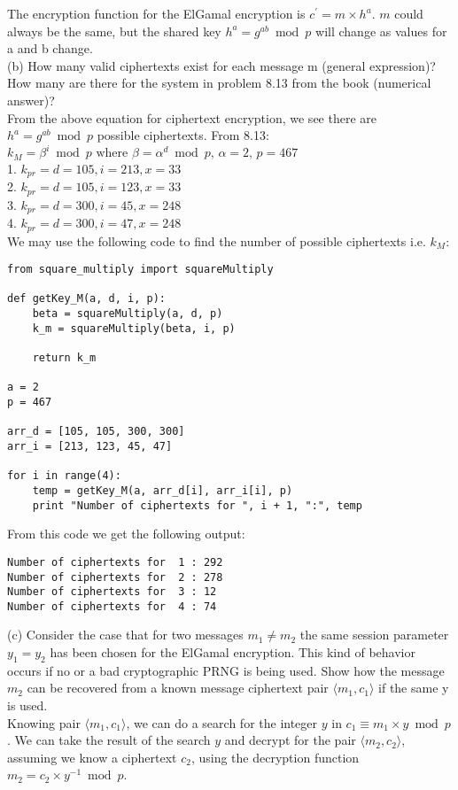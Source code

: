 \documentclass{article}
\begin{document}
The encryption function for the ElGamal encryption is $c^\prime = m\times h^a$. $m$ could always be the same, but the shared key $h^a = g^{ab} \bmod p$ will change as values for a and b change.\\

(b) How many valid ciphertexts exist for each message m (general expression)? How many are there for the system in problem 8.13 from the book (numerical answer)?\\

From the above equation for ciphertext encryption, we see there are $h^a = g^{ab} \bmod p$ possible ciphertexts. From 8.13:\\
$k_M = \beta^i \bmod p \textrm{ where } \beta = \alpha^d \bmod p \textrm{, }\alpha = 2 \textrm{, } p = 467$\\
1. $k_{pr} = d = 105, i = 213, x = 33$\\
2. $k_{pr} = d = 105, i = 123, x = 33$\\
3. $k_{pr} = d = 300, i = 45, x = 248$\\
4. $k_{pr} = d = 300, i = 47, x = 248$\\
We may use the following code to find the number of possible ciphertexts i.e. $k_M$:
\begin{framed}
\begin{verbatim}
from square_multiply import squareMultiply

def getKey_M(a, d, i, p):
    beta = squareMultiply(a, d, p)
    k_m = squareMultiply(beta, i, p)

    return k_m

a = 2
p = 467

arr_d = [105, 105, 300, 300]
arr_i = [213, 123, 45, 47]

for i in range(4):
    temp = getKey_M(a, arr_d[i], arr_i[i], p)
    print "Number of ciphertexts for ", i + 1, ":", temp
\end{verbatim}
\end{framed}
From this code we get the following output:
\begin{framed}
\begin{verbatim}
Number of ciphertexts for  1 : 292
Number of ciphertexts for  2 : 278
Number of ciphertexts for  3 : 12
Number of ciphertexts for  4 : 74
\end{verbatim}
\end{framed}

(c) Consider the case that for two messages $m_1 \neq m_2$ the same session parameter $y_1 = y_2$ has been chosen for the ElGamal encryption. This kind of behavior occurs if no or a bad cryptographic PRNG is being used. Show how the message $m_2$ can be recovered from a known message ciphertext pair $\langle m_1, c_1\rangle$ if the same y is used.\\

Knowing pair $\langle m_1, c_1\rangle$, we can do a search for the integer $y$ in $c_1 \equiv m_1 \times y \bmod p$. We can take the result of the search $y$ and decrypt for the pair $\langle m_2, c_2\rangle$, assuming we know a ciphertext $c_2$, using the decryption function $m_2 = c_2 \times y^{-1} \bmod p$.
\end{document}
